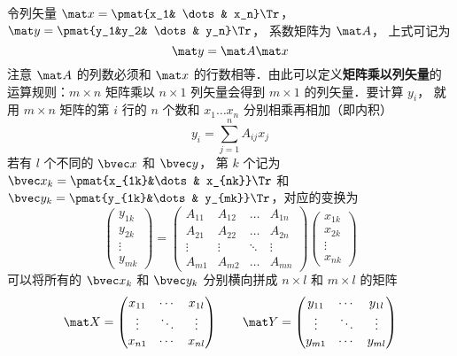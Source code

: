 令列矢量 $\mat x = \pmat{x_1& \dots& x_n}\Tr $，  $\mat y = \pmat{y_1&y_2& \dots& y_n}\Tr$， 系数矩阵为 $\mat A$， 上式可记为
\begin{equation}\label{Mat_eq5}
\mat y = \mat A\mat x
\end{equation} 
注意 $\mat A$ 的列数必须和 $\mat x$ 的行数相等．由此可以定义\textbf{矩阵乘以列矢量}的运算规则：$m \times n$ 矩阵乘以 $n \times 1$ 列矢量会得到 $m \times 1$ 的列矢量．要计算 $y_i$， 就用 $m \times n$ 矩阵的第 $i$ 行的 $n$ 个数和 $x_1 \dots x_n$ 分别相乘再相加（即内积）
\begin{equation}\label{Mat_eq6}
y_i = \sum_{j = 1}^n A_{ij} x_j 
\end{equation}
若有 $l$ 个不同的 $\bvec x$ 和 $\bvec y$， 第 $k$ 个记为 $\bvec x_k = \pmat{x_{1k}&\dots& x_{nk}}\Tr$ 和 $\bvec y_k = \pmat{y_{1k}&\dots& y_{mk}}\Tr$，对应的变换为
\begin{equation}
\begin{pmatrix} y_{1k} \\ y_{2k}\\ \vdots \\ y_{mk} \end{pmatrix}
= \begin{pmatrix}
A_{11}  & A_{12} & \ldots & A_{1n} \\
A_{21}  & A_{22} & \ldots & A_{2n} \\
 \vdots & \vdots  & \ddots & \vdots \\
A_{m1}  & A_{m2} & \ldots & A_{mn}
\end{pmatrix}
\begin{pmatrix} x_{1k} \\ x_{2k} \\ \vdots \\ x_{nk} \end{pmatrix}
\end{equation}
可以将所有的 $\bvec x_k$ 和 $\bvec y_k$ 分别横向拼成 $n \times l$ 和 $m \times l$ 的矩阵
\begin{equation}
\mat X =
\begin{pmatrix}
x_{11} & \cdots & x_{1l} \\
 \vdots & \ddots & \vdots \\
x_{n1} & \cdots & x_{nl}
\end{pmatrix}
\qquad
\mat Y =
\begin{pmatrix}
y_{11} & \cdots & y_{1l} \\
 \vdots & \ddots & \vdots \\
y_{m1} & \cdots & y_{ml}
\end{pmatrix}
\end{equation}

